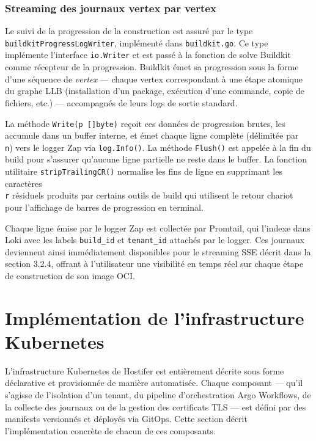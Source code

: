 \subsubsection*{Streaming des journaux vertex par vertex}

Le suivi de la progression de la construction est assuré par le type \texttt{buildkitProgressLogWriter}, implémenté dans \texttt{buildkit.go}. Ce type implémente l'interface \texttt{io.Writer} et est passé à la fonction de solve Buildkit comme récepteur de la progression. Buildkit émet sa progression sous la forme d'une séquence de \textit{vertex} — chaque vertex correspondant à une étape atomique du graphe LLB (installation d'un package, exécution d'une commande, copie de fichiers, etc.) — accompagnés de leurs logs de sortie standard.

La méthode \texttt{Write(p []byte)} reçoit ces données de progression brutes, les accumule dans un buffer interne, et émet chaque ligne complète (délimitée par \texttt{\\n}) vers le logger Zap via \texttt{log.Info()}. La méthode \texttt{Flush()} est appelée à la fin du build pour s'assurer qu'aucune ligne partielle ne reste dans le buffer. La fonction utilitaire \texttt{stripTrailingCR()} normalise les fins de ligne en supprimant les caractères \texttt{\\r} résiduels produits par certains outils de build qui utilisent le retour chariot pour l'affichage de barres de progression en terminal.

Chaque ligne émise par le logger Zap est collectée par Promtail, qui l'indexe dans Loki avec les labels \texttt{build\_id} et \texttt{tenant\_id} attachés par le logger. Ces journaux deviennent ainsi immédiatement disponibles pour le streaming SSE décrit dans la section 3.2.4, offrant à l'utilisateur une visibilité en temps réel sur chaque étape de construction de son image OCI.




\section{Implémentation de l'infrastructure Kubernetes}

L'infrastructure Kubernetes de Hostifer est entièrement décrite sous forme déclarative et provisionnée de manière automatisée. Chaque composant — qu'il s'agisse de l'isolation d'un tenant, du pipeline d'orchestration Argo Workflows, de la collecte des journaux ou de la gestion des certificats TLS — est défini par des manifests versionnés et déployés via GitOps. Cette section décrit l'implémentation concrète de chacun de ces composants.

